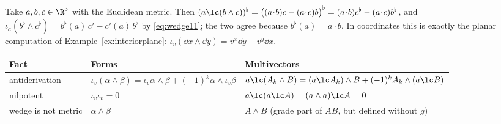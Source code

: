 \begin{example}\label{ex:lcvsiota}
Take $a,b,c\in\R^3$ with the Euclidean metric. Then $(a\lc(b\wedge c))^\flat=\bigl((a\!\cdot\!b)c-(a\!\cdot\!c)b\bigr)^\flat=(a\!\cdot\!b)c^\flat-(a\!\cdot\!c)b^\flat$, and
$\iota_a(b^\flat\wedge c^\flat)=b^\flat(a)\,c^\flat-c^\flat(a)\,b^\flat$ by \eqref{eq:wedge11}; the two agree because $b^\flat(a)=a\cdot b$. In coordinates this is exactly
the planar computation of Example~\ref{ex:interiorplane}: $\iota_v(\dd x\wedge\dd y)=v^x\dd y-v^y\dd x$.
\end{example}

\begin{synthesis}
\renewcommand{\arraystretch}{1.3}
\begin{center}\small
\begin{tabular}{@{}p{3.6cm}p{4.0cm}p{4.0cm}@{}}
\toprule
\textbf{Fact} & \textbf{Forms} & \textbf{Multivectors}\\
\midrule
antiderivation & $\iota_v(\alpha\wedge\beta)=\iota_v\alpha\wedge\beta+(-1)^k\alpha\wedge\iota_v\beta$ & $a\lc(A_k\wedge B)=(a\lc A_k)\wedge B+(-1)^kA_k\wedge(a\lc B)$\\
nilpotent & $\iota_v\iota_v=0$ & $a\lc(a\lc A)=(a\wedge a)\lc A=0$\\
wedge is not metric & $\alpha\wedge\beta$ & $A\wedge B$ (grade part of $AB$, but defined without $g$)\\
\bottomrule
\end{tabular}
\end{center}
\end{synthesis}
